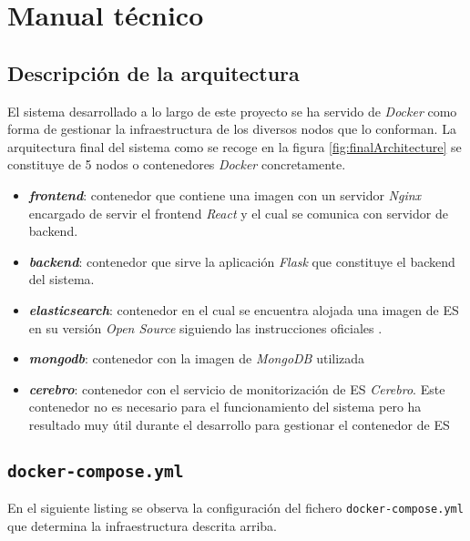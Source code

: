 \chapter{Manual técnico}

\section{Descripción de la arquitectura}
El sistema desarrollado a lo largo de este proyecto se ha servido de \textit{Docker} como forma de gestionar la infraestructura de los diversos nodos que lo conforman. La arquitectura final del sistema como se recoge en la figura \ref{fig:finalArchitecture} se constituye de 5 nodos o contenedores \textit{Docker} concretamente.

\begin{itemize}
	\item \textit{\textbf{frontend}}: contenedor que contiene una imagen con un servidor \textit{Nginx} encargado de servir el \gls{frontend} \textit{React} y el cual se comunica con servidor de \gls{backend}. 
	
	\item \textit{\textbf{backend}}: contenedor que sirve la aplicación \textit{Flask} que constituye el \gls{backend} del sistema.
	\item \textit{\textbf{elasticsearch}}: contenedor en el cual se encuentra alojada una imagen de \acrlong{ES} en su versión \textit{Open Source} siguiendo las instrucciones oficiales \cite{ES_docker}.
	\item \textit{\textbf{mongodb}}: contenedor con la imagen de \textit{MongoDB} utilizada
	\item \textit{\textbf{cerebro}}: contenedor con el servicio de monitorización de \acrshort{ES} \textit{Cerebro}. Este contenedor no es necesario para el funcionamiento del sistema pero ha resultado muy útil durante el desarrollo para gestionar el contenedor de \acrshort{ES}
\end{itemize}

\section{\texttt{docker-compose.yml}}
En el siguiente listing se observa la configuración del fichero \texttt{docker-compose.yml} que determina la infraestructura descrita arriba.



